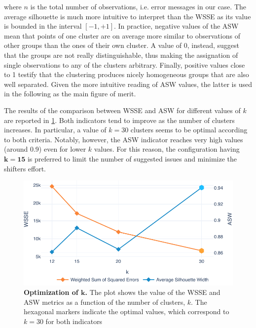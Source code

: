 where $n$ is the total number of observations, i.e. error messages in our case.
The average silhouette is much more intuitive to interpret than the WSSE as its value is bounded in the interval $\left[ -1, +1 \right]$.
In practice, negative values of the ASW mean that points of one cluster are on average more similar to observations of other groups than the ones of their own cluster. A value of 0, instead, suggest that the groups are not really distinguishable, thus making the assignation of single observations to any of the clusters arbitrary.
Finally, positive values close to 1 testify that the clustering produces nicely homogeneous groups that are also well separated.
Given the more intuitive reading of ASW values, the latter is used in the following as the main figure of merit.


The results of the comparison between WSSE and ASW for different values of $k$ are reported in \cref{fig:k_optim}.
Both indicators tend to improve as the number of clusters increases.
In particular, a value of $k=30$ clusters seems to be optimal according to both criteria.
Notably, however, the ASW indicator reaches very high values (around 0.9) even for lower $k$ values.
For this reason, the configuration having $\boldsymbol{k=15}$ is preferred to limit the number of suggested issues and minimize the shifters effort.

\begin{figure}
    \centering
    \includegraphics[width=\textwidth]{figures/410_method/kmeans/k_optim.pdf}
    \caption{\textbf{Optimization of $\boldsymbol{k}$.} The plot shows the value of the WSSE and ASW metrics as a function of the number of clusters, $k$. The hexagonal markers indicate the optimal values, which correspond to $k=30$ for both indicators}
    \label{fig:k_optim}
\end{figure}
